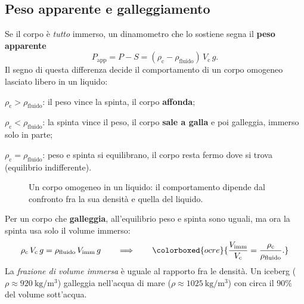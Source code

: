 \subsection{Peso apparente e galleggiamento}
Se il corpo è \emph{tutto} immerso, un dinamometro che lo sostiene segna il \textbf{peso apparente}
\[ P_\text{app} = P - S = (\rho_\text{c} - \rho_\text{fluido})\,V_\text{c}\,g. \]
Il segno di questa differenza decide il comportamento di un corpo omogeneo lasciato libero in un liquido:
\begin{elenco}
    \item $\rho_\text{c} > \rho_\text{fluido}$: il peso vince la spinta, il corpo \textbf{affonda};
    \item $\rho_\text{c} < \rho_\text{fluido}$: la spinta vince il peso, il corpo \textbf{sale a galla} e poi galleggia, immerso solo in parte;
    \item $\rho_\text{c} = \rho_\text{fluido}$: peso e spinta si equilibrano, il corpo resta fermo dove si trova (equilibrio indifferente).
\end{elenco}

\begin{figure}[!htbp]
    \centering
    \caption{Un corpo omogeneo in un liquido: il comportamento dipende dal confronto fra la sua densità e quella del liquido.}
    \label{fig:galleggia}
\end{figure}

Per un corpo che \textbf{galleggia}, all'equilibrio peso e spinta sono uguali, ma ora la spinta usa solo il volume immerso:
\[ \rho_\text{c}\,V_\text{c}\,g = \rho_\text{fluido}\,V_\text{imm}\,g \qquad\Longrightarrow\qquad
   \colorboxed{ocre}{ \frac{V_\text{imm}}{V_\text{c}} = \frac{\rho_\text{c}}{\rho_\text{fluido}}. } \]
La \emph{frazione di volume immersa} è uguale al rapporto fra le densità. Un iceberg ($\rho \approx \SI{920}{\kilo\gram\per\metre\cubed}$) galleggia nell'acqua di mare ($\rho \approx \SI{1025}{\kilo\gram\per\metre\cubed}$) con circa il $90\%$ del volume sott'acqua.

